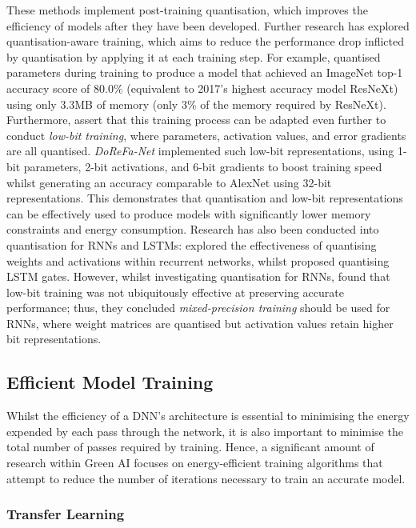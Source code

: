 \documentclass[a4paper, 11pt]{report}
\begin{document}
    These methods implement post-training quantisation, which improves the efficiency of models after they have been developed. Further research has explored quantisation-aware training, which aims to reduce the performance drop inflicted by quantisation by applying it at each training step. For example, \citet{fan-2020b} quantised parameters during training to produce a model that achieved an ImageNet top-1 accuracy score of $80.0\%$ (equivalent to 2017's highest accuracy model ResNeXt) using only $3.3$MB of memory (only $3\%$ of the memory required by ResNeXt). Furthermore, \citet{cai-2022} assert that this training process can be adapted even further to conduct \emph{low-bit training}, where parameters, activation values, and error gradients are all quantised. \emph{DoReFa-Net} \citep{zhou-2016} implemented such low-bit representations, using 1-bit parameters, 2-bit activations, and 6-bit gradients to boost training speed whilst generating an accuracy comparable to AlexNet using 32-bit representations. This demonstrates that quantisation and low-bit representations can be effectively used to produce models with significantly lower memory constraints and energy consumption. Research has also been conducted into quantisation for RNNs and LSTMs: \citet{hubara-2016} explored the effectiveness of quantising weights and activations within recurrent networks, whilst \citet{he-2016} proposed quantising LSTM gates. However, whilst investigating quantisation for RNNs, \citet{ott-2017} found that low-bit training was not ubiquitously effective at preserving accurate performance; thus, they concluded \emph{mixed-precision training} should be used for RNNs, where weight matrices are quantised but activation values retain higher bit representations.


    \subsection{Efficient Model Training}

    Whilst the efficiency of a DNN's architecture is essential to minimising the energy expended by each pass through the network, it is also important to minimise the total number of passes required by training. Hence, a significant amount of research within Green AI focuses on energy-efficient training algorithms that attempt to reduce the number of iterations necessary to train an accurate model.


    \subsubsection{Transfer Learning}
\end{document}
